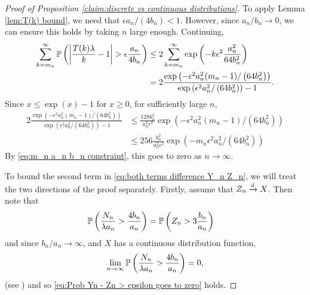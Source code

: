 \begin{proof}[Proof of Proposition \ref{claim:discrete vs continuous distributions}]
		To apply Lemma \ref{lem:T(k) bound}, we need that $\epsilon a_n / (4b_n) < 1$. However, since $a_n/b_n \rightarrow 0$, we can ensure this holds by taking $n$ large enough. %
		Continuing,
		\begin{align}
			\sum_{k = m_n}^\infty \mathbb{P}\left(\left|\frac{T(k)\lambda}{k} - 1\right| > \epsilon\frac{a_n}{4 b_n} \right) &\leq 2 \sum_{k = m_n}^\infty \exp\left(-k \epsilon^2 \frac{a_n^2}{64b_n^2}\right)\\
			&= 2 \frac{\exp\left(-\epsilon^2 a_n^2 (m_n-1) /\left(64b_n^2\right)\right)}{\exp\left(\epsilon^2 a_n^2/\left(64b_n^2\right)\right) - 1}.
		\end{align}
		Since $x \leq \exp(x) - 1$ for $x \geq 0$, for sufficiently large $n$,
		\begin{align}
		2 \frac{\exp\left(-\epsilon^2 a_n^2 (m_n-1) /\left(64b_n^2\right)\right)}{\exp\left(\epsilon^2 a_n^2/\left(64b_n^2\right)\right) - 1} &\leq \frac{128 b_n^2}{a_n^2 \epsilon^2} \exp\left(-\epsilon^2 a_n^2 (m_n-1) /\left(64b_n^2\right)\right)\\
		&\leq 256 \frac{b_n^2}{a_n^2 \epsilon^2} \exp\left(-m_n \epsilon^2 a_n^2/\left(64b_n^2\right)\right)
		\end{align}
		By \eqref{eq:m_n a_n b_n constraint}, this goes to zero as $n \rightarrow \infty$.

		To bound the second term in \eqref{eq:both terms difference Y_n Z_n}, we will treat the two directions of the proof separately. Firstly, assume that $Z_n \xrightarrow{d} X$. Then note that
		\begin{align}
			\mathbb{P}\left(\frac{N_n}{\lambda a_n} > \frac{4 b_n}{a_n} \right) &= \mathbb{P}\left(Z_n > 3\frac{b_n}{a_n} \right)
		\end{align}
		and since $b_n / a_n \rightarrow \infty$, and $X$ has a continuous distribution function,
		\begin{equation}
			\lim_{n\rightarrow \infty} \mathbb{P}\left(\frac{N_n}{\lambda a_n} > \frac{4 b_n}{a_n} \right) = 0,
		\end{equation}
		(see \cite[Theorem 14.2, Lemma 2]{Billingsley1995-en}) and so \eqref{eq:Prob Yn - Zn > epsilon goes to zero} holds.


\end{proof}

